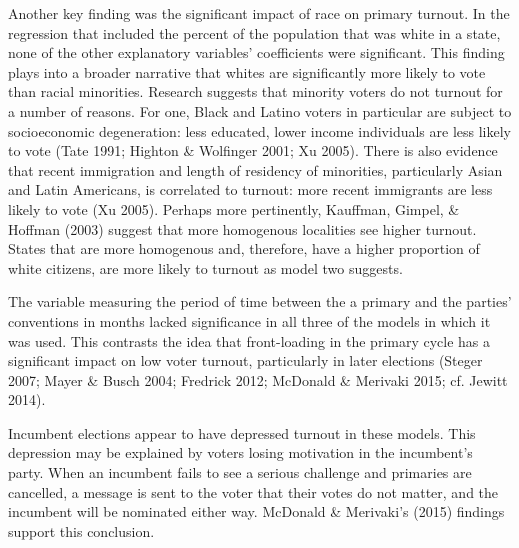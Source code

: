 \documentclass[12pt]{article}
\begin{document}
\begin{doublespace}
		Another key finding was the significant impact of race on primary turnout. In the regression that included the percent of the population that was white in a state, none of the other explanatory variables' coefficients were significant. This finding plays into a broader narrative that whites are significantly more likely to vote than racial minorities. Research suggests that minority voters do not turnout for a number of reasons. For one, Black and Latino voters in particular are subject to socioeconomic degeneration: less educated, lower income individuals are less likely to vote (Tate 1991; Highton \& Wolfinger 2001; Xu 2005). There is also evidence that recent immigration and length of residency of minorities, particularly Asian and Latin Americans, is correlated to turnout: more recent immigrants are less likely to vote (Xu 2005). Perhaps more pertinently, Kauffman, Gimpel, \& Hoffman (2003) suggest that more homogenous localities see higher turnout. States that are more homogenous and, therefore, have a higher proportion of white citizens, are more likely to turnout as model two suggests. \par
		The variable measuring the period of time between the a primary and the parties’ conventions in months lacked significance in all three of the models in which it was used. This contrasts the idea that front-loading in the primary cycle has a significant impact on low voter turnout, particularly in later elections (Steger 2007; Mayer \& Busch 2004; Fredrick 2012; McDonald \& Merivaki 2015; cf. Jewitt 2014). \par
		Incumbent elections appear to have depressed turnout in these models. This depression may be explained by voters losing motivation in the incumbent’s party. When an incumbent fails to see a serious challenge and primaries are cancelled, a message is sent to the voter that their votes do not matter, and the incumbent will be nominated either way. McDonald \& Merivaki’s (2015) findings support this conclusion. \par

\end{doublespace}
\end{document}
